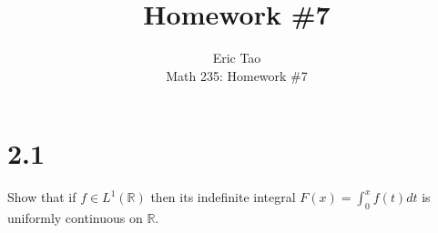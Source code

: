 \documentclass[10pt]{article}
\newenvironment{problem}[2][Problem]{\begin{trivlist}
\item[\hskip \labelsep {\bfseries #1}\hskip \labelsep {\bfseries #2.}]}{\end{trivlist}}
\begin{document}
 
\title{Homework \#7}
\author{Eric Tao\\
Math 235: Homework \#7}
\maketitle
 
\section*{2.1}

\begin{problem}{4.5.17}

Show that if $f \in L^1(\mathbb{R})$ then its indefinite integral $F(x) = \int_0^x f(t)dt$ is uniformly continuous on $\mathbb{R}$.

\end{problem}
\end{document}

